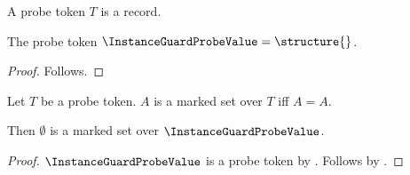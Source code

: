 

\begin{struct}\label{instance_guard_probe_token}
    A probe token $T$ is a record.
\end{struct}

\begin{instance}\label{instance_guard_probe_value}
    The probe token $\InstanceGuardProbeValue=\structure{}$.
\end{instance}
\begin{proof}
    Follows.
\end{proof}

\begin{definition}\label{instance_guard_probe_predicate}
    Let $T$ be a probe token.
    $A$ is a marked set over $T$ iff $A=A$.
\end{definition}

\begin{theorem}\label{instance_guard_probe_parameter}
    Then $\emptyset$ is a marked set over $\InstanceGuardProbeValue$.
\end{theorem}
\begin{proof}
    $\InstanceGuardProbeValue$ is a probe token by .
    Follows by .
\end{proof}
